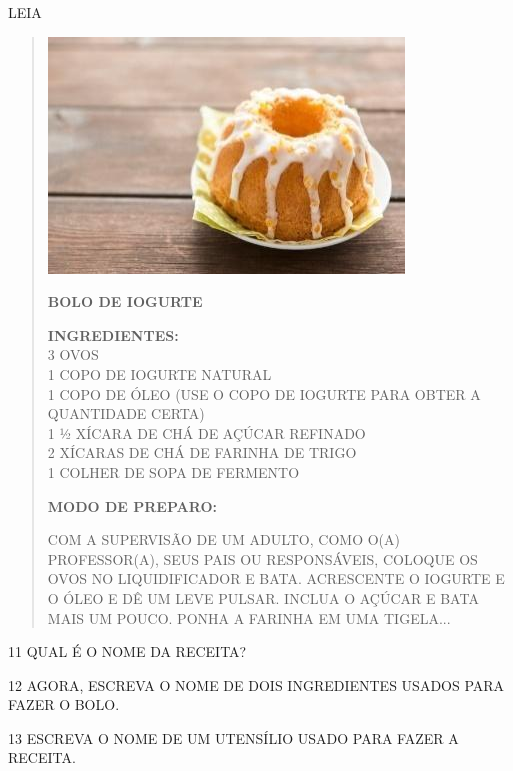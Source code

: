 \pagebreak
LEIA


\begin{quote}
\includegraphics[width=.7\textwidth]{media/image130.jpg}

\textbf{BOLO DE IOGURTE}

\begin{flushleft}
\textbf{INGREDIENTES:}\\
3 OVOS\\
1 COPO DE IOGURTE NATURAL\\
1 COPO DE ÓLEO (USE O COPO DE IOGURTE PARA OBTER A QUANTIDADE CERTA)\\
1 ½ XÍCARA DE CHÁ DE AÇÚCAR REFINADO\\
2 XÍCARAS DE CHÁ DE FARINHA DE TRIGO\\
1 COLHER DE SOPA DE FERMENTO

\textbf{MODO DE PREPARO:}

COM A SUPERVISÃO DE UM ADULTO, COMO O(A) PROFESSOR(A), SEUS PAIS OU RESPONSÁVEIS, COLOQUE OS OVOS NO LIQUIDIFICADOR E BATA. ACRESCENTE O IOGURTE E O ÓLEO E DÊ UM LEVE PULSAR. INCLUA O AÇÚCAR E BATA MAIS UM POUCO. PONHA A FARINHA EM UMA TIGELA...
\end{flushleft}

\end{quote}

\num{11} QUAL É O NOME DA RECEITA?


\num{12} AGORA, ESCREVA O NOME DE DOIS INGREDIENTES USADOS PARA FAZER O BOLO.


\num{13} ESCREVA O NOME DE UM UTENSÍLIO USADO PARA FAZER A RECEITA.

